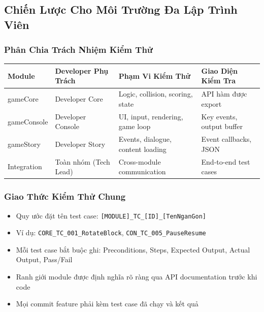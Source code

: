 \documentclass[12pt,a4paper]{article}
\begin{document}
\subsection{Chiến Lược Cho Môi Trường Đa Lập Trình Viên}

\subsubsection{Phân Chia Trách Nhiệm Kiểm Thử}

\begin{table}[H]
\centering
{}
\begin{tabularx}{\linewidth}{|l|l|X|X|}
\hline
\rowcolor{gray!35}
\textbf{Module} & \textbf{Developer Phụ Trách} & \textbf{Phạm Vi Kiểm Thử} & \textbf{Giao Diện Kiểm Tra} \\ \hline
gameCore    & Developer Core    & Logic, collision, scoring, state & API hàm được export \\ \hline
gameConsole & Developer Console & UI, input, rendering, game loop  & Key events, output buffer \\ \hline
gameStory   & Developer Story   & Events, dialogue, content loading & Event callbacks, JSON \\ \hline
Integration & Toàn nhóm (Tech Lead) & Cross-module communication    & End-to-end test cases \\ \hline
\end{tabularx}
\end{table}

\subsubsection{Giao Thức Kiểm Thử Chung}
\begin{itemize}[leftmargin=3em]
  \item Quy ước đặt tên test case: \texttt{[MODULE]\_TC\_[ID]\_[TenNganGon]}
  \item Ví dụ: \texttt{CORE\_TC\_001\_RotateBlock}, \texttt{CON\_TC\_005\_PauseResume}
  \item Mỗi test case bắt buộc ghi: Preconditions, Steps, Expected Output, Actual Output, Pass/Fail
  \item Ranh giới module được định nghĩa rõ ràng qua API documentation trước khi code
  \item Mọi commit feature phải kèm test case đã chạy và kết quả
\end{itemize}
\end{document}
